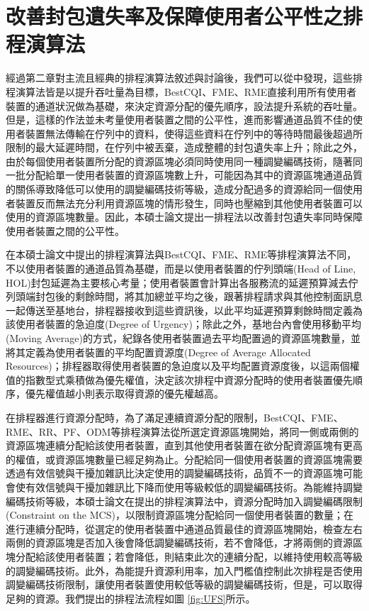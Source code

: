 %
\chapter{改善封包遺失率及保障使用者公平性之排程演算法}
經過第二章對主流且經典的排程演算法敘述與討論後，我們可以從中發現，這些排程演算法皆是以提升吞吐量為目標，BestCQI\cite{su2016}、FME\cite{fmerme2008}、RME\cite{safa2012}直接利用所有使用者裝置的通道狀況做為基礎，來決定資源分配的優先順序，設法提升系統的吞吐量。但是，這樣的作法並未考量使用者裝置之間的公平性，進而影響通道品質不佳的使用者裝置無法傳輸在佇列中的資料，使得這些資料在佇列中的等待時間最後超過所限制的最大延遲時間，在佇列中被丟棄，造成整體的封包遺失率上升；除此之外，由於每個使用者裝置所分配的資源區塊必須同時使用同一種調變編碼技術，隨著同一批分配給單一使用者裝置的資源區塊數上升，可能因為其中的資源區塊通道品質的關係導致降低可以使用的調變編碼技術等級，造成分配過多的資源給同一個使用者裝置反而無法充分利用資源區塊的情形發生，同時也壓縮到其他使用者裝置可以使用的資源區塊數量。因此，本碩士論文提出一排程法以改善封包遺失率同時保障使用者裝置之間的公平性。

在本碩士論文中提出的排程演算法與BestCQI、FME、RME等排程演算法不同，不以使用者裝置的通道品質為基礎，而是以使用者裝置的佇列頭端(Head of Line, HOL)封包延遲為主要核心考量；使用者裝置會計算出各服務流的延遲預算減去佇列頭端封包後的剩餘時間，將其加總並平均之後，跟著排程請求與其他控制面訊息一起傳送至基地台，排程器接收到這些資訊後，以此平均延遲預算剩餘時間定義為該使用者裝置的急迫度(Degree of Urgency)；除此之外，基地台內會使用移動平均(Moving Average)的方式，紀錄各使用者裝置過去平均配置過的資源區塊數量，並將其定義為使用者裝置的平均配置資源度(Degree of Average Allocated Resources)；排程器取得使用者裝置的急迫度以及平均配置資源度後，以這兩個權值的指數型式乘積做為優先權值，決定該次排程中資源分配時的使用者裝置優先順序，優先權值越小則表示取得資源的優先權越高。

在排程器進行資源分配時，為了滿足連續資源分配的限制，BestCQI、FME、RME、RR\cite{arsh2015}、PF\cite{kush2002}、ODM\cite{kana2015}等排程演算法從所選定資源區塊開始，將同一側或兩側的資源區塊連續分配給該使用者裝置，直到其他使用者裝置在欲分配資源區塊有更高的權值，或資源區塊數量已經足夠為止。分配給同一個使用者裝置的資源區塊需要透過有效信號與干擾加雜訊比決定使用的調變編碼技術，品質不一的資源區塊可能會使有效信號與干擾加雜訊比下降而使用等級較低的調變編碼技術。為能維持調變編碼技術等級，本碩士論文在提出的排程演算法中，資源分配時加入調變編碼限制(Constraint on the MCS)，以限制資源區塊分配給同一個使用者裝置的數量；在進行連續分配時，從選定的使用者裝置中通道品質最佳的資源區塊開始，檢查左右兩側的資源區塊是否加入後會降低調變編碼技術，若不會降低，才將兩側的資源區塊分配給該使用者裝置；若會降低，則結束此次的連續分配，以維持使用較高等級的調變編碼技術。此外，為能提升資源利用率，加入門檻值控制此次排程是否使用調變編碼技術限制，讓使用者裝置使用較低等級的調變編碼技術，但是，可以取得足夠的資源。我們提出的排程法流程如圖 \ref{fig:UFS}所示。

